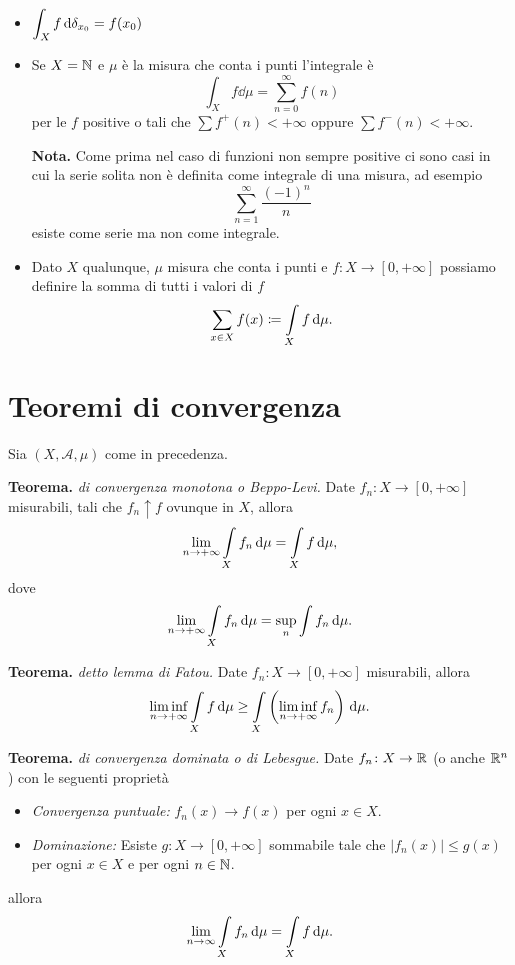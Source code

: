 \documentclass[a4paper, 12pt]{report}
\begin{document}
\begin{itemize}
	\item $\displaystyle \int_X f \,\mathrm{d} \delta_{x_0} = f(x_0)$
	
	\item Se $X = \mathbb N$ e $\mu$ è la misura che conta i punti l'integrale è 
		$$
		\int_X f \dd \mu = \sum_{n = 0}^{\infty} f(n) 
		$$ 
		per le $f$ positive o tali che $\sum f^+(n) < +\infty $ oppure $\sum f^-(n) < +\infty $.
		
		\textbf{Nota.} Come prima nel caso di funzioni non sempre positive ci sono casi in cui la serie solita non è definita come integrale di una misura, ad esempio
		$$
		\sum_{n=1}^{\infty} \frac{(-1)^n}{n}
		$$
		esiste come serie ma non come integrale.
		
	\item Dato $X$ qualunque, $\mu$ misura che conta i punti e $f \colon  X \to [0,+\infty] $ possiamo definire la somma di tutti i valori di $f$ 
		$$
		\sum_{x \in X} f(x) \coloneqq \int\limits_{\mathclap{X}} f \dd \mu.  
		$$ 
\end{itemize}

\section{Teoremi di convergenza}

Sia $(X, \mathcal{A}, \mu)$ come in precedenza.

\textbf{Teorema.}
\textit{di convergenza monotona o Beppo-Levi.}
Date $f_n \colon  X \to [0,+\infty]$ misurabili, tali che $f_n \uparrow f$ ovunque in $X$, allora
$$
\lim_{n \to +\infty} \int\limits_{\mathclap{X}} f_n \dd \mu = \int\limits_X f \dd \mu,
$$
dove
$$
\lim_{n \to +\infty} \int\limits_{\mathclap{X}} f_n \dd \mu = \sup_n \int f_n \dd \mu.
$$


\textbf{Teorema.}
\textit{detto lemma di Fatou.}
Date $f_n \colon X \to [0,+\infty]$ misurabili, allora
$$
\liminf_{n \to +\infty} \int\limits_X f \dd \mu \geq \int\limits_{\mathclap{X}} \left( \liminf_{n \to +\infty} f_n \right) \dd \mu.
$$ 

\textbf{Teorema.}
\textit{di convergenza dominata o di Lebesgue.}
Date $f_n \colon  X \to \mathbb R$ (o anche $\mathbb R^n$) con le seguenti proprietà
\begin{itemize}
	\item \textit{Convergenza puntuale:} $f_n (x) \to f(x)$ per ogni $x \in X$.
	\item \textit{Dominazione:} Esiste $g \colon X \to [0,+\infty]$ sommabile tale che $\left| f_n (x) \right| \leq g(x)$ per ogni $x \in X$ e per ogni $n \in \mathbb N$.
\end{itemize}
allora
$$
\lim_{n \to \infty} \int\limits_{\mathclap{X}} f_n \dd \mu = \int\limits_X f \dd \mu. 
$$ 
\end{document}
